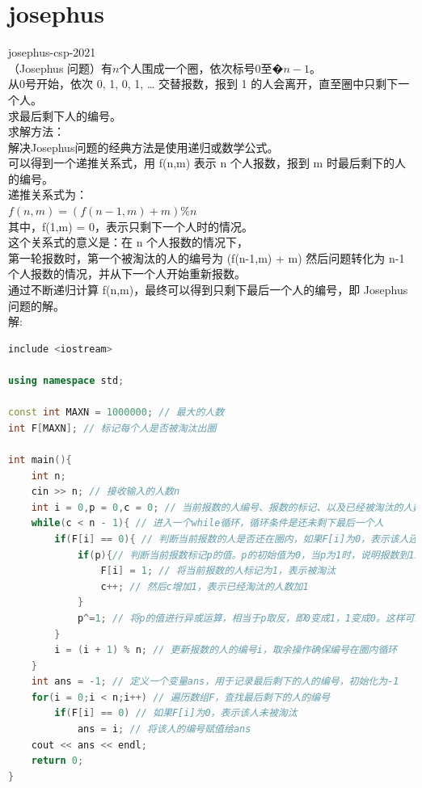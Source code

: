 \documentclass[12pt,twiside,a4paper]{ctexbook}
\numberwithin{chapter}{part}
\begin{document}
\section{josephus}
josephus-csp-2021\\
（Josephus 问题）有$n$个人围成一个圈，依次标号0至$�n-1$。\\
从0号开始，依次 0, 1, 0, 1, … 交替报数，报到 1 的人会离开，直至圈中只剩下一个人。\\
求最后剩下人的编号。\\
求解方法：\\
解决Josephus问题的经典方法是使用递归或数学公式。\\
可以得到一个递推关系式，用 f(n,m) 表示 n 个人报数，报到 m 时最后剩下的人的编号。\\
递推关系式为：\\
$f(n,m)=(f(n-1,m)+m)\%n$\\
其中，f(1,m) = 0，表示只剩下一个人时的情况。\\
这个关系式的意义是：在 n 个人报数的情况下，\\
第一轮报数时，第一个被淘汰的人的编号为 (f(n-1,m) + m) %
然后问题转化为 n-1 个人报数的情况，并从下一个人开始重新报数。\\
通过不断递归计算 f(n,m)，最终可以得到只剩下最后一个人的编号，即 Josephus 问题的解。\\
解:\\
\begin{lstlisting}[language=c++,breaklines=true]
include <iostream>

using namespace std;

const int MAXN = 1000000; // 最大的人数
int F[MAXN]; // 标记每个人是否被淘汰出圈

int main(){
	int n;
	cin >> n; // 接收输入的人数n
	int i = 0,p = 0,c = 0; // 当前报数的人编号、报数的标记、以及已经被淘汰的人数
	while(c < n - 1){ // 进入一个while循环，循环条件是还未剩下最后一个人
		if(F[i] == 0){ // 判断当前报数的人是否还在圈内，如果F[i]为0，表示该人还在圈内
			if(p){// 判断当前报数标记p的值。p的初始值为0，当p为1时，说明报数到1i，该人将被淘汰
				F[i] = 1; // 将当前报数的人标记为1，表示被淘汰
				c++; // 然后c增加1，表示已经淘汰的人数加1 
			} 
			p^=1; // 将p的值进行异或运算，相当于p取反，即0变成1，1变成0。这样可以实现交替报数的效果
		}
		i = (i + 1) % n; // 更新报数的人的编号i，取余操作确保编号在圈内循环
	}
	int ans = -1; // 定义一个变量ans，用于记录最后剩下的人的编号，初始化为-1
	for(i = 0;i < n;i++) // 遍历数组F，查找最后剩下的人的编号
		if(F[i] == 0) // 如果F[i]为0，表示该人未被淘汰
			ans = i; // 将该人的编号赋值给ans
	cout << ans << endl;
	return 0;
}
\end{lstlisting}
\end{document}
